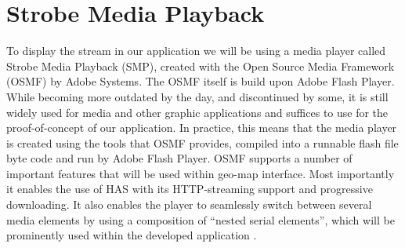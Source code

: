 \section{Strobe Media Playback}
\label{sec:smp}

To display the stream in our application we will be using a media player called Strobe Media Playback (SMP), created with the Open Source Media Framework (OSMF) by Adobe Systems. The OSMF itself is build upon Adobe Flash Player. While becoming more outdated by the day, and discontinued by some, it is still widely used for media and other graphic applications and suffices to use for the proof-of-concept of our application. In practice, this means that the media player is created using the tools that OSMF provides, compiled into a runnable flash file byte code and run by Adobe Flash Player. OSMF supports a number of important features that will be used within geo-map interface. Most importantly it enables the use of HAS with its HTTP-streaming support and progressive downloading. It also enables the player to seamlessly switch between several media elements by using a composition of “nested serial elements”, which will be prominently used within the developed application \cite{osmf}.

